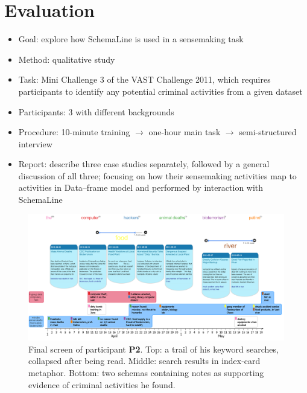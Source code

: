 \section{Evaluation}
\begin{itemize}
	\item Goal: explore how SchemaLine is used in a sensemaking task
	\item Method: qualitative study 
	\item Task: Mini Challenge 3 of the VAST Challenge 2011, which requires participants to identify any potential criminal activities from a given dataset
	\item Participants: 3 with different backgrounds
	\item Procedure:  10-minute training $\rightarrow$ one-hour main task $\rightarrow$ semi-structured interview
	\item Report: describe three case studies separately, followed by a general discussion of all three; focusing on how their sensemaking activities map to activities in Data--frame model and performed by interaction with SchemaLine
\end{itemize}

\begin{figure}[!htb]
	\centering
	\includegraphics[width=\linewidth]{evaluation}
	\caption{Final screen of participant \textbf{P2}. Top: a trail of his keyword searches, collapsed after being read. Middle: search results in index-card metaphor. Bottom: two schemas containing notes as supporting evidence of criminal activities he found.}
	\label{fig:evaluation}
\end{figure}



%
%
%
%
%
%
%